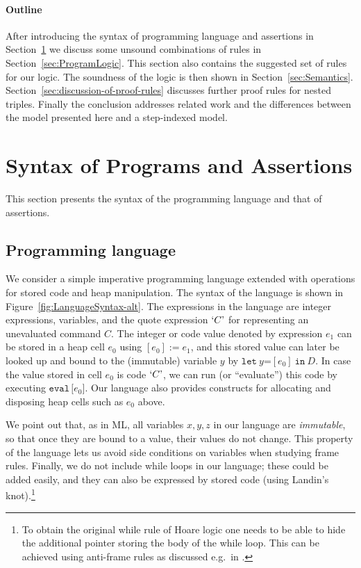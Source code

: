 \documentclass{LMCS}
\theoremstyle{remark}
\newcommand{\QUOTE}[1]{\textnormal{`\ensuremath{#1}'}}
\newcommand{\UNQUOTE}[1]{\SYN{eval}\,{#1}}
\newcommand{\SYN}[1]{\ensuremath{\texttt{#1}}}
\begin{document}
\paragraph{Outline} After introducing the syntax of programming language and assertions in Section~\ref{sec:syntax} we discuss some unsound combinations of rules in Section~\ref{sec:ProgramLogic}. This section also contains the suggested set of rules for our logic.   The soundness of the logic is then shown  in Section~\ref{sec:Semantics}.
Section~\ref{sec:discussion-of-proof-rules} discusses further proof rules for nested triples. Finally the conclusion  addresses  related work and   the differences between the model presented here and a step-indexed model.


\section{Syntax of Programs and Assertions}
\label{sec:syntax}
 
This section presents the syntax of the programming language and that of assertions.

\subsection{Programming language}
We consider a simple imperative programming language extended with operations for 
stored code and heap manipulation. The syntax of the language is shown in 
Figure~\ref{fig:LanguageSyntax-alt}. The expressions in the language are
integer expressions, variables, and the quote expression
$\QUOTE{C}$ for representing an unevaluated command $C$. The integer
or code value denoted by expression $e_1$ can be stored in a heap cell
$e_0$ using $[e_0]{:=}e_1$, and this stored value can later be looked up
and bound to the (immutable) variable $y$ by $\SYN{let}~y\SYN{=}[e_0]~\SYN{in}~D$.
In case the value stored in cell $e_0$ is code $\QUOTE{C}$, we can
run (or ``evaluate'') this code by executing $\UNQUOTE [e_0]$. Our language also
provides constructs for allocating and disposing heap cells such as $e_0$
above. 

We point out that, as in ML, all variables $x,y,z$ in
our language are \emph{immutable}, so that once they are bound to a value, their values do not change. 
This property of the language lets us avoid side conditions on variables when studying frame rules.
Finally, we do not include while loops in our language; these could be added easily, and they can also be expressed by stored code (using Landin's knot).\footnote{To obtain the original while rule of Hoare logic one needs to be able to hide the additional pointer storing the body of the while loop. This can be achieved  using anti-frame rules as discussed e.g.\ in \cite{schwinghammerYBPR10}.}
 
\end{document}
